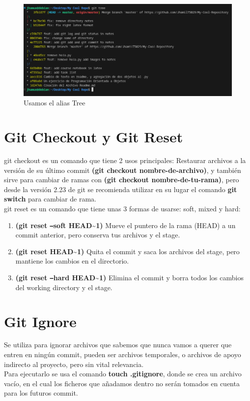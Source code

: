 \documentclass[13pt]{article}
\begin{document}
\begin{figure}[H]
	\centering
	\includegraphics[scale = 0.4]{Images/alias2.png}
	\caption {\small Usamos el alias Tree}
\end{figure}

\section{Git Checkout y Git Reset}
git checkout es un comando que tiene 2 usos principales: Restaurar archivos a la versión de su último commit \textbf{(git checkout nombre-de-archivo)}, y también sirve para cambiar de ramas con \textbf{(git checkout nombre-de-tu-rama)}, pero desde la versión 2.23 de git se recomienda utilizar en su lugar el comando \textbf{git switch} para cambiar de rama.\\


git reset es un comando que tiene unas 3 formas de usarse: soft, mixed y hard:
\begin{enumerate}
	\item \textbf{(git reset \texttt{--}soft HEAD\textasciitilde1)} Mueve el puntero de la rama (HEAD) a un commit anterior, pero conserva tus archivos y el stage.
	\item \textbf{(git reset HEAD\textasciitilde1)} Quita el commit y saca los archivos del stage, pero mantiene los cambios en el directorio.
	\item \textbf{(git reset \texttt{--}hard HEAD\textasciitilde1)} Elimina el commit y borra todos los cambios del working directory y el stage.
\end{enumerate}

\section{Git Ignore}
Se utiliza para ignorar archivos que sabemos que nunca vamos a querer que entren en ningún commit, pueden ser archivos temporales, o archivos de apoyo indirecto al proyecto, pero sin vital relevancia.\\
Para ejecutarlo se usa el comando \textbf{touch .gitignore}, donde se crea un archivo vacío, en el cual los ficheros que añadamos dentro no serán tomados en cuenta para los futuros commit.\\
\end{document}
